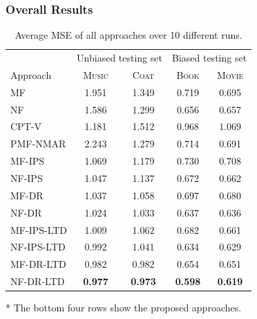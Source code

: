 \documentclass[letterpaper]{article} %
\begin{document}
\subsubsection{Overall Results}
\begin{table}[tbp]
\small
\centering
\caption{Average MSE of all approaches over 10 different runs.}
\label{tab:mse overall results}
\begin{threeparttable}
\begin{tabular}{l|cc||cc}
\toprule
& \multicolumn{2}{c||}{Unbiased testing set} & \multicolumn{2}{c}{Biased testing set} \\
\cmidrule(rl){2-5}
Approach & \textsc{Music} & \textsc{Coat} & \textsc{Book} & \textsc{Movie} \\
\midrule
MF & 1.951 & 1.349 & 0.719 & 0.695 \\
NF & 1.586 & 1.299 & 0.656 & 0.657 \\
\midrule
CPT-V & 1.181 & 1.512 & 0.968 & 1.069 \\
PMF-NMAR & 2.243 & 1.279 & 0.714 & 0.691 \\
MF-IPS & 1.069 & 1.179 & 0.730 & 0.708 \\
NF-IPS & 1.047 & 1.137 & 0.672 & 0.662 \\
MF-DR & 1.037 & 1.058 & 0.697 & 0.680 \\
NF-DR & 1.024 & 1.033 & 0.637 & 0.636 \\
\midrule
MF-IPS-LTD & 1.009 & 1.062 & 0.682 & 0.661 \\
NF-IPS-LTD & 0.992 & 1.041 & 0.634 & 0.629 \\
MF-DR-LTD & 0.982 & 0.982 & 0.654 & 0.651 \\
NF-DR-LTD & \textbf{0.977} & \textbf{0.973} & \textbf{0.598} & \textbf{0.619} \\
\bottomrule
\end{tabular}
\begin{tablenotes}[flushleft]
\footnotesize
\item[*] The bottom four rows show the proposed approaches.
\end{tablenotes}
\end{threeparttable}
\end{table}
\end{document}
